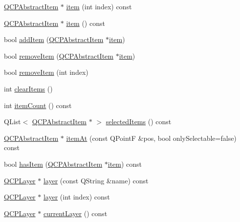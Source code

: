 \begin{DoxyCompactItemize}
\item 
\hyperlink{class_q_c_p_abstract_item}{Q\+C\+P\+Abstract\+Item} $\ast$ \hyperlink{class_q_custom_plot_a3e842b5a65b1d17fbb96cfb1fa1314d1}{item} (int index) const 
\item 
\hyperlink{class_q_c_p_abstract_item}{Q\+C\+P\+Abstract\+Item} $\ast$ \hyperlink{class_q_custom_plot_a700399eae539798c5baf64a37c7f2135}{item} () const 
\item 
bool \hyperlink{class_q_custom_plot_aa500620379262321685cb7a7674cbd2a}{add\+Item} (\hyperlink{class_q_c_p_abstract_item}{Q\+C\+P\+Abstract\+Item} $\ast$\hyperlink{class_q_custom_plot_a3e842b5a65b1d17fbb96cfb1fa1314d1}{item})
\item 
bool \hyperlink{class_q_custom_plot_ae04446557292551e8fb6e2c106e1848d}{remove\+Item} (\hyperlink{class_q_c_p_abstract_item}{Q\+C\+P\+Abstract\+Item} $\ast$\hyperlink{class_q_custom_plot_a3e842b5a65b1d17fbb96cfb1fa1314d1}{item})
\item 
bool \hyperlink{class_q_custom_plot_abcfdda3d601c0441cab136137d715dea}{remove\+Item} (int index)
\item 
int \hyperlink{class_q_custom_plot_abdfd07d4f0591d0cf967f85013fd3645}{clear\+Items} ()
\item 
int \hyperlink{class_q_custom_plot_a6fc860e30df17fd5c46056bf6fe29390}{item\+Count} () const 
\item 
Q\+List$<$ \hyperlink{class_q_c_p_abstract_item}{Q\+C\+P\+Abstract\+Item} $\ast$ $>$ \hyperlink{class_q_custom_plot_a1a48b13547e2d9ac5cd6927516f47a2e}{selected\+Items} () const 
\item 
\hyperlink{class_q_c_p_abstract_item}{Q\+C\+P\+Abstract\+Item} $\ast$ \hyperlink{class_q_custom_plot_a793e4b04e0ede11a733021907368fa83}{item\+At} (const Q\+Point\+F \&pos, bool only\+Selectable=false) const 
\item 
bool \hyperlink{class_q_custom_plot_ab4199c38b03e63a2623c82453fe8add5}{has\+Item} (\hyperlink{class_q_c_p_abstract_item}{Q\+C\+P\+Abstract\+Item} $\ast$\hyperlink{class_q_custom_plot_a3e842b5a65b1d17fbb96cfb1fa1314d1}{item}) const 
\item 
\hyperlink{class_q_c_p_layer}{Q\+C\+P\+Layer} $\ast$ \hyperlink{class_q_custom_plot_aac492da01782820454e9136a8db28182}{layer} (const Q\+String \&name) const 
\item 
\hyperlink{class_q_c_p_layer}{Q\+C\+P\+Layer} $\ast$ \hyperlink{class_q_custom_plot_a1e73051e371f1815b48d8b355be0d2ab}{layer} (int index) const 
\item 
\hyperlink{class_q_c_p_layer}{Q\+C\+P\+Layer} $\ast$ \hyperlink{class_q_custom_plot_af73057345656cbd1463454982d808b00}{current\+Layer} () const 

\end{DoxyCompactItemize}
